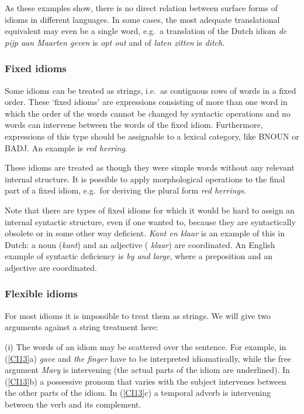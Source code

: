 As these examples show, there is no direct relation between surface forms of
idioms in different languages. In some cases, the most adequate translational
equivalent may even be a single word, e.g.\ a translation of the Dutch idiom
{\em de pijp aan Maarten geven} is {\em opt out} and of {\em laten zitten} is
{\em ditch}. 

\subsubsection{Fixed idioms}

Some idioms can be treated as strings, i.e.\ as contiguous rows of words in a
fixed order. 
These `fixed idioms' are expressions consisting of more than one word in 
which the order of the words cannot be changed by syntactic operations and no
words can intervene between the words of the fixed idiom. Furthermore, 
expressions of this type should be assignable to a lexical category, like BNOUN 
or BADJ. An example is {\em red herring}.

These idioms  are treated as though they were simple words without any relevant
internal structure. It is possible to apply morphological operations to the
final part of a fixed idiom, e.g.\ for deriving the plural form {\em red
herrings}. 

Note that there are types of fixed idioms for which it would be hard to assign
an internal syntactic structure, even if one wanted to, because they are
syntactically obsolete or in some other way deficient. {\em Kant en klaar} is
an example of this in Dutch: a noun ({\em kant\/}) and an adjective ({\em
klaar\/}) are coordinated. An English example of syntactic deficiency is {\em
by and large}, where a preposition and an adjective are coordinated. 

\subsubsection{Flexible idioms}

For most idioms it is impossible to treat them as strings.
We will give two arguments against a string treatment here:

(i) The words of an idiom may be scattered over the sentence. For example, in
(\ref{CI13}a) {\em gave} and {\em the finger} have to be interpreted
idiomatically, while the free argument {\em Mary} is intervening (the actual 
parts of the idiom are underlined). In  (\ref{CI13}b) a possessive
pronoun that varies with the subject intervenes between the 
other parts of the idiom. In
(\ref{CI13}c) a temporal adverb is intervening between the verb and its
complement. \\
 

